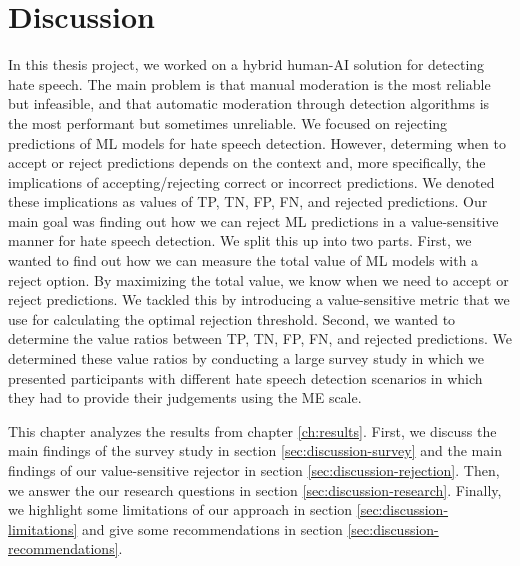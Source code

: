 \chapter{Discussion}
In this thesis project, we worked on a hybrid human-AI solution for detecting hate speech.
%
The main problem is that manual moderation is the most reliable but infeasible, and that automatic moderation through detection algorithms is the most performant but sometimes unreliable.
%
We focused on rejecting predictions of ML models for hate speech detection.
%
However, determing when to accept or reject predictions depends on the context and, more specifically, the implications of accepting/rejecting correct or incorrect predictions.
%
We denoted these implications as values of TP, TN, FP, FN, and rejected predictions.
%
Our main goal was finding out how we can reject ML predictions in a value-sensitive manner for hate speech detection.
%
We split this up into two parts.
%
First, we wanted to find out how we can measure the total value of ML models with a reject option.
%
By maximizing the total value, we know when we need to accept or reject predictions.
%
We tackled this by introducing a value-sensitive metric that we use for calculating the optimal rejection threshold.
%
Second, we wanted to determine the value ratios between TP, TN, FP, FN, and rejected predictions.
%
We determined these value ratios by conducting a large survey study in which we presented participants with different hate speech detection scenarios in which they had to provide their judgements using the ME scale.
%

%
This chapter analyzes the results from chapter \ref{ch:results}.
%
First, we discuss the main findings of the survey study in section \ref{sec:discussion-survey} and the main findings of our value-sensitive rejector in section \ref{sec:discussion-rejection}.
%
Then, we answer the our research questions in section \ref{sec:discussion-research}.
%
Finally, we highlight some limitations of our approach in section \ref{sec:discussion-limitations} and give some recommendations in section \ref{sec:discussion-recommendations}.


